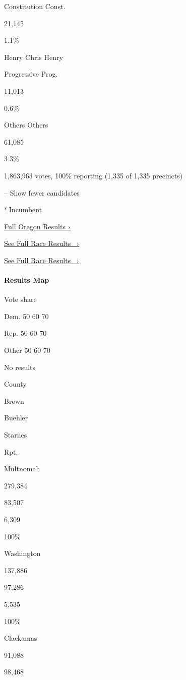 Constitution Const.

21,145

1.1\%

 Henry Chris Henry

Progressive Prog.

11,013

0.6\%

 Others Others

61,085

3.3\%

1,863,963 votes, 100\% reporting (1,335 of 1,335 precincts)

-- Show fewer candidates

* Incumbent

\href{https://www.nytimes3xbfgragh.onion/interactive/2018/11/06/us/elections/results-oregon-elections.html}{Full
Oregon Results ›}

\href{https://www.nytimes3xbfgragh.onion/elections/results/oregon-governor}{See
Full Race Results~ ›}

\href{https://www.nytimes3xbfgragh.onion/elections/results/oregon-governor}{See
Full Race Results~ ›}

\hypertarget{results-map}{%
\paragraph{Results Map}\label{results-map}}

Vote share

Dem. 50 60 70

Rep. 50 60 70

Other 50 60 70

No results

County

Brown

Buehler

Starnes

Rpt.

Multnomah

279,384

83,507

6,309

100\%

Washington

137,886

97,286

5,535

100\%

Clackamas

91,088

98,468

